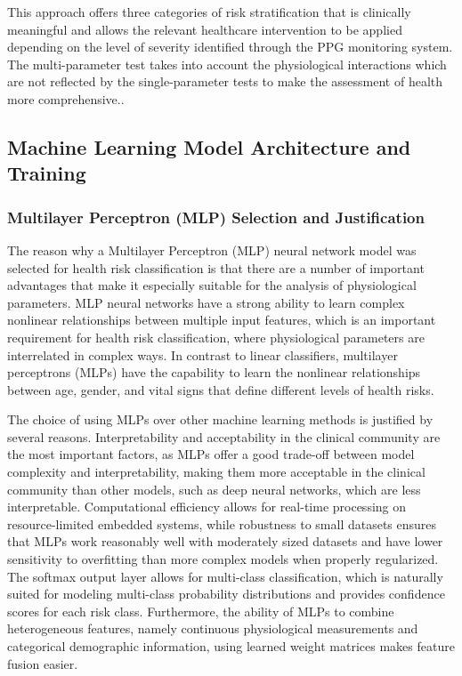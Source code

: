\documentclass{ieeeaccess}
\begin{document}
This approach offers three categories of risk stratification that is clinically meaningful and allows the relevant healthcare intervention to be applied depending on the level of severity identified through the PPG monitoring system. The multi-parameter test takes into account the physiological interactions which are not reflected by the single-parameter tests to make the assessment of health more comprehensive..

\subsection{Machine Learning Model Architecture and Training}

\subsubsection{Multilayer Perceptron (MLP) Selection and Justification}
The reason why a Multilayer Perceptron (MLP) neural network model was selected for health risk classification is that there are a number of important advantages that make it especially suitable for the analysis of physiological parameters. MLP neural networks have a strong ability to learn complex nonlinear relationships between multiple input features, which is an important requirement for health risk classification, where physiological parameters are interrelated in complex ways\cite{b22}. In contrast to linear classifiers, multilayer perceptrons (MLPs) have the capability to learn the nonlinear relationships between age, gender, and vital signs that define different levels of health risks.

The choice of using MLPs over other machine learning methods is justified by several reasons. Interpretability and acceptability in the clinical community are the most important factors, as MLPs offer a good trade-off between model complexity and interpretability, making them more acceptable in the clinical community than other models, such as deep neural networks, which are less interpretable. Computational efficiency allows for real-time processing on resource-limited embedded systems, while robustness to small datasets ensures that MLPs work reasonably well with moderately sized datasets and have lower sensitivity to overfitting than more complex models when properly regularized. The softmax output layer allows for multi-class classification, which is naturally suited for modeling multi-class probability distributions and provides confidence scores for each risk class. Furthermore, the ability of MLPs to combine heterogeneous features, namely continuous physiological measurements and categorical demographic information, using learned weight matrices makes feature fusion easier.
\end{document}
